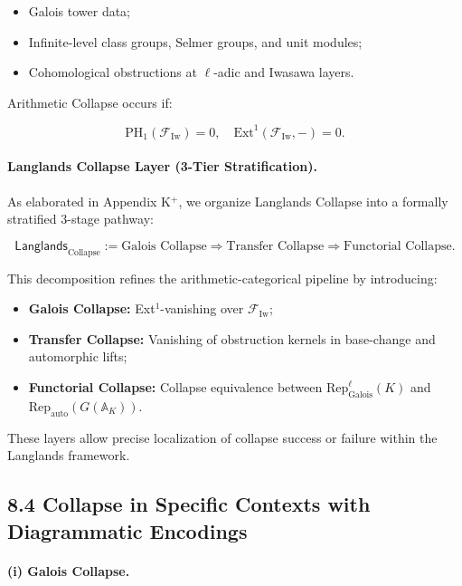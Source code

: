 \documentclass[11pt]{article}
\begin{document}
\begin{itemize}
    \item Galois tower data;
    \item Infinite-level class groups, Selmer groups, and unit modules;
    \item Cohomological obstructions at $\ell$-adic and Iwasawa layers.
\end{itemize}

Arithmetic Collapse occurs if:

\[
\mathrm{PH}_1(\mathcal{F}_{\mathrm{Iw}}) = 0, \quad \mathrm{Ext}^1(\mathcal{F}_{\mathrm{Iw}}, -) = 0.
\]

\paragraph{Langlands Collapse Layer (3-Tier Stratification).}

As elaborated in Appendix K$^+$, we organize Langlands Collapse into a formally stratified 3-stage pathway:

\[
\mathsf{Langlands}_{\mathrm{Collapse}} :=
\text{Galois Collapse}
\Rightarrow
\text{Transfer Collapse}
\Rightarrow
\text{Functorial Collapse}.
\]

This decomposition refines the arithmetic-categorical pipeline by introducing:

\begin{itemize}
    \item \textbf{Galois Collapse:} Ext$^1$-vanishing over \( \mathcal{F}_{\mathrm{Iw}} \);
    \item \textbf{Transfer Collapse:} Vanishing of obstruction kernels in base-change and automorphic lifts;
    \item \textbf{Functorial Collapse:} Collapse equivalence between \( \mathrm{Rep}_{\mathrm{Galois}}^\ell(K) \) and \( \mathrm{Rep}_{\mathrm{auto}}(G(\mathbb{A}_K)) \).
\end{itemize}

These layers allow precise localization of collapse success or failure within the Langlands framework.

\subsection*{8.4 Collapse in Specific Contexts with Diagrammatic Encodings}

\paragraph{(i) Galois Collapse.}
\end{document}
